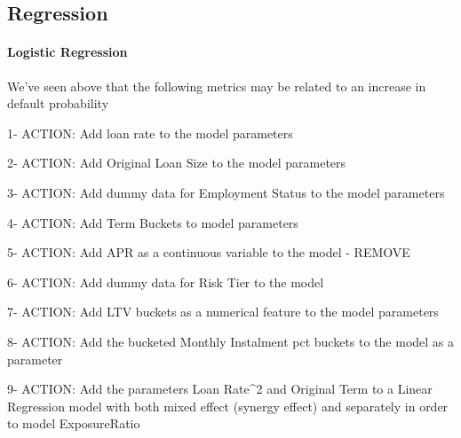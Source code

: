 \documentclass[11pt]{article}
\begin{document}
    \subsection{Regression}\label{regression}

    \paragraph{Logistic Regression}\label{logistic-regression}

    We've seen above that the following metrics may be related to an
increase in default probability

1- ACTION: Add loan rate to the model parameters

2- ACTION: Add Original Loan Size to the model parameters

3- ACTION: Add dummy data for Employment Status to the model parameters

4- ACTION: Add Term Buckets to model parameters

5- ACTION: Add APR as a continuous variable to the model - REMOVE

6- ACTION: Add dummy data for Risk Tier to the model

7- ACTION: Add LTV buckets as a numerical feature to the model
parameters

8- ACTION: Add the bucketed Monthly Instalment pct buckets to the model
as a parameter

9- ACTION: Add the parameters Loan Rate\^{}2 and Original Term to a
Linear Regression model with both mixed effect (synergy effect) and
separately in order to model ExposureRatio
\end{document}
